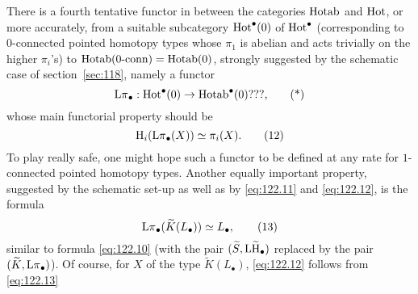 There is a fourth tentative functor in between the categories
$\operatorname{Hotab}$ and $\operatorname{Hot}$, or more accurately, from a suitable
subcategory $\operatorname{Hot}^\bullet(0)$ of $\operatorname{Hot}^\bullet$ (corresponding to
$0$-connected pointed homotopy types whose $\pi_1$ is abelian and acts
trivially on the higher $\pi_i$'s) to $\operatorname{Hotab}(0\textup{-}\mathrm{conn})=\operatorname{Hotab}(0)$,
strongly suggested by the schematic case of section~\ref{sec:118},
namely a functor
\begin{equation}
  \label{eq:122.star}
  \operatorname{L\pi}_\bullet: \operatorname{Hot}^\bullet(0) \to \operatorname{Hotab}^\bullet(0)\text{???,}\tag{*}
\end{equation}
whose main functorial property should be
\begin{equation}
  \label{eq:122.12}
  \mathrm H_i(\operatorname{L\pi}_\bullet(X)) \simeq \pi_i(X).\tag{12}
\end{equation}
To play really safe, one might hope such a functor to be defined at
any rate for $1$-connected pointed homotopy types. Another equally
important property, suggested by the schematic set-up as well as by
\eqref{eq:122.11} and \eqref{eq:122.12}, is the formula
\begin{equation}
  \label{eq:122.13}
  \operatorname{L\pi}_\bullet(\widetilde K(L_\bullet)) \simeq L_\bullet,\tag{13}
\end{equation}
similar to formula \eqref{eq:122.10} (with the pair $(\widetilde
S,\operatorname{L\widetilde H}_\bullet)$ replaced by the pair $(\widetilde
K,\operatorname{L\pi}_\bullet)$). Of course, for $X$ of the type $\widetilde
K(L_\bullet)$, \eqref{eq:122.12} follows from \eqref{eq:122.13}

\bigbreak

\presectionfill{}\par


